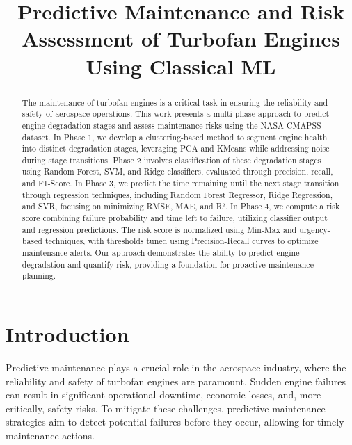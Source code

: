 \documentclass[conference]{IEEEtran}
\begin{document}
\title{Predictive Maintenance and Risk Assessment of Turbofan Engines Using Classical ML}

\author{
\and
{}
\and
{}
\and
{}
\and
{}
}

\maketitle
\pagestyle{plain}

\begin{abstract}
The maintenance of turbofan engines is a critical task in ensuring the reliability and safety of aerospace operations. This work presents a multi-phase approach to predict engine degradation stages and assess maintenance risks using the NASA CMAPSS dataset. In Phase 1, we develop a clustering-based method to segment engine health into distinct degradation stages, leveraging PCA and KMeans while addressing noise during stage transitions. Phase 2 involves classification of these degradation stages using Random Forest, SVM, and Ridge classifiers, evaluated through precision, recall, and F1-Score. In Phase 3, we predict the time remaining until the next stage transition through regression techniques, including Random Forest Regressor, Ridge Regression, and SVR, focusing on minimizing RMSE, MAE, and R². In Phase 4, we compute a risk score combining failure probability and time left to failure, utilizing classifier output and regression predictions. The risk score is normalized using Min-Max and urgency-based techniques, with thresholds tuned using Precision-Recall curves to optimize maintenance alerts. Our approach demonstrates the ability to predict engine degradation and quantify risk, providing a foundation for proactive maintenance planning.
\end{abstract}


\section{Introduction}
Predictive maintenance plays a crucial role in the aerospace industry, where the reliability and safety of turbofan engines are paramount. Sudden engine failures can result in significant operational downtime, economic losses, and, more critically, safety risks. To mitigate these challenges, predictive maintenance strategies aim to detect potential failures before they occur, allowing for timely maintenance actions.
\end{document}
